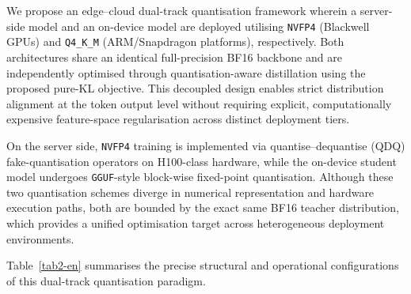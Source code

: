 \documentclass[a4paper,fleqn]{cas-sc}
\begin{document}
We propose an edge--cloud dual-track quantisation framework wherein a server-side model and an on-device model are deployed utilising \texttt{NVFP4} (Blackwell GPUs) and \texttt{Q4\_K\_M} (ARM/Snapdragon platforms), respectively. Both architectures share an identical full-precision BF16 backbone and are independently optimised through quantisation-aware distillation using the proposed pure-KL objective. This decoupled design enables strict distribution alignment at the token output level without requiring explicit, computationally expensive feature-space regularisation across distinct deployment tiers.

On the server side, \texttt{NVFP4} training is implemented via quantise--dequantise (QDQ) fake-quantisation operators on H100-class hardware, while the on-device student model undergoes \texttt{GGUF}-style block-wise fixed-point quantisation. Although these two quantisation schemes diverge in numerical representation and hardware execution paths, both are bounded by the exact same BF16 teacher distribution, which provides a unified optimisation target across heterogeneous deployment environments.

Table~\ref{tab2-en} summarises the precise structural and operational configurations of this dual-track quantisation paradigm.
\end{document}
